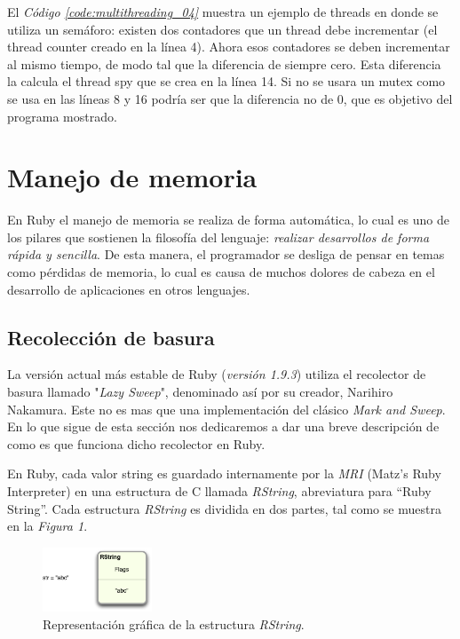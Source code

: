 \documentclass{article}
\newcommand{\refcode}[1]{\textit{Código \ref{#1}}}
\begin{document}
El \refcode{code:multithreading_04} muestra un ejemplo de threads en donde se utiliza un semáforo: existen dos contadores que un thread debe incrementar (el thread counter creado en la línea 4). Ahora esos contadores se deben incrementar al mismo tiempo, de modo tal que la diferencia de siempre cero. Esta diferencia la calcula el thread spy que se crea en la línea 14. Si no se usara un mutex como se usa en las líneas 8 y 16 podría ser que la diferencia no de 0, que es objetivo del programa mostrado. 
 
\bigskip




\section{Manejo de memoria}

	En Ruby el manejo de memoria se realiza de forma automática, lo cual es uno de los pilares que sostienen la filosofía del lenguaje: \textit{realizar desarrollos de forma rápida y sencilla}. De esta manera, el programador se desliga de pensar en temas como pérdidas de memoria, lo cual es causa de muchos dolores de cabeza en el desarrollo de aplicaciones en otros lenguajes.
\bigskip



\subsection{Recolección de basura}

	La versión actual más estable de Ruby (\textit{versión 1.9.3}) utiliza el recolector de basura llamado "\textit{Lazy Sweep}", denominado así por su creador, Narihiro Nakamura. Este no es mas que una implementación del clásico \textit{Mark and Sweep}. En lo que sigue de esta sección nos dedicaremos a dar una breve descripción de como es que funciona dicho recolector en Ruby.
	\par
	En Ruby, cada valor string es guardado internamente por la \textit{MRI} (Matz's Ruby Interpreter) en una estructura de C llamada \textit{RString}, abreviatura para ``Ruby String''. Cada estructura \textit{RString} es dividida en dos partes, tal como se muestra en la \textit{Figura 1}.
\bigskip

\begin{figure}[h]
	\centering
	\includegraphics[width=0.29\textwidth]{images/gc/gc01-rstring.png}
	\caption{Representación gráfica de la estructura \textit{RString}.}
\end{figure}
\bigskip
\end{document}
